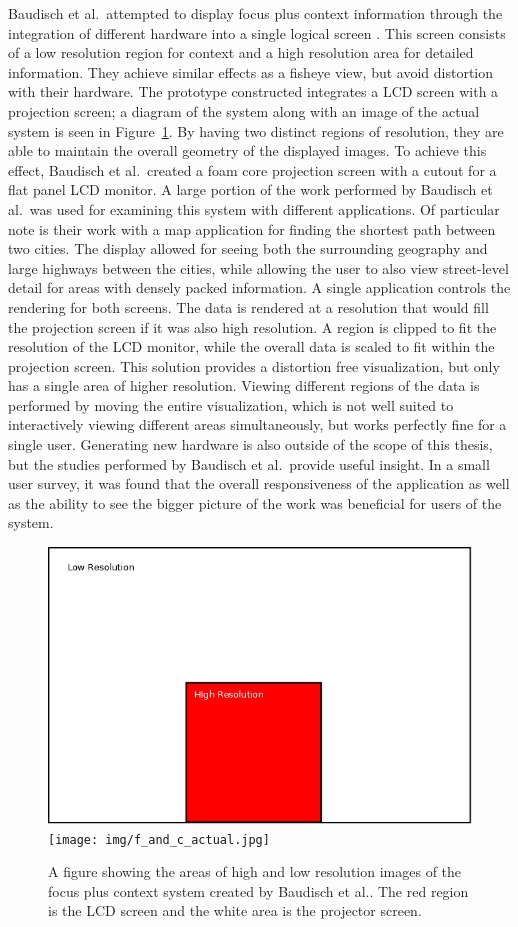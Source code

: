 Baudisch et al.\ attempted to display focus plus context information through the integration of different hardware into a single logical screen \cite{Baudisch2001}. This screen consists of a low resolution region for context and a high resolution area for detailed information. They achieve similar effects as a fisheye view, but avoid distortion with their hardware. The prototype constructed integrates a LCD screen with a projection screen; a diagram of the system along with an image
of the actual system is seen in Figure~\ref{fig:f_and_c}.  By having two distinct regions of resolution, they are able to maintain the overall
geometry of the displayed images. To achieve this effect, Baudisch et al.\ created a foam core projection screen with a cutout for a flat panel LCD monitor. A large portion of the work performed by Baudisch et al.\ was used for examining this system with different applications. Of particular note is their work with a map application for finding the shortest path between two cities. The display allowed for seeing both the surrounding geography and large highways between the cities, while
allowing the user to also view street-level detail for areas with densely packed information. A single application controls the rendering for both screens. The data is rendered at a resolution that would fill the projection screen if it was also high resolution. A region is clipped to fit the resolution of the LCD monitor, while the overall data is scaled to fit within the projection screen. This solution provides a distortion free visualization, but only has a single area of
higher resolution. Viewing different regions of the data is performed by moving the entire visualization, which is not well suited to interactively viewing different areas simultaneously, but works perfectly fine for a single user. Generating new hardware is also outside of the scope of this thesis, but the studies performed by Baudisch et al.\ provide useful insight. In a small user survey, it was found that the overall responsiveness of the application as well as the ability to see the bigger picture of the work was beneficial for users of the system.

\begin{figure}[htp] \centering
    \includegraphics[width=0.45\linewidth]{img/f_and_c.jpg}
    \texttt{[image: img/f\_and\_c\_actual.jpg]}
    \caption[Focus Plus Context Screen Diagram]{A figure showing the areas of high and low resolution images of 
    the focus plus context \cite{Baudisch2001} system created by Baudisch et al.. The red region is the LCD screen and the white area is the 
    projector screen.}
    \label{fig:f_and_c}
\end{figure}

